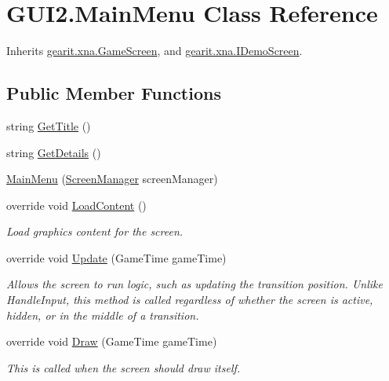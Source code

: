 \hypertarget{class_g_u_i2_1_1_main_menu}{\section{G\+U\+I2.\+Main\+Menu Class Reference}
\label{class_g_u_i2_1_1_main_menu}
}


Inherits \hyperlink{classgearit_1_1xna_1_1_game_screen}{gearit.\+xna.\+Game\+Screen}, and \hyperlink{interfacegearit_1_1xna_1_1_i_demo_screen}{gearit.\+xna.\+I\+Demo\+Screen}.

\subsection*{Public Member Functions}
\begin{DoxyCompactItemize}
\item 
string \hyperlink{class_g_u_i2_1_1_main_menu_a42dad5d14ce987d5e8eb6c4e5af1069a}{Get\+Title} ()
\item 
string \hyperlink{class_g_u_i2_1_1_main_menu_a9682f88618cdcb124ba15003749f3fcc}{Get\+Details} ()
\item 
\hyperlink{class_g_u_i2_1_1_main_menu_a1e198ea91f467e8f9c2f4eb3b7bd7fba}{Main\+Menu} (\hyperlink{classgearit_1_1xna_1_1_screen_manager}{Screen\+Manager} screen\+Manager)
\item 
override void \hyperlink{class_g_u_i2_1_1_main_menu_a28913f4d61b2f7eb011b7287c77a1ca0}{Load\+Content} ()
\begin{DoxyCompactList}\small\item\em Load graphics content for the screen. \end{DoxyCompactList}\item 
override void \hyperlink{class_g_u_i2_1_1_main_menu_a9a4fee48c5ab27b5c18dfa5760f42d27}{Update} (Game\+Time game\+Time)
\begin{DoxyCompactList}\small\item\em Allows the screen to run logic, such as updating the transition position. Unlike Handle\+Input, this method is called regardless of whether the screen is active, hidden, or in the middle of a transition. \end{DoxyCompactList}\item 
override void \hyperlink{class_g_u_i2_1_1_main_menu_a35a4f3fa03bb60327c3822458d532ea2}{Draw} (Game\+Time game\+Time)
\begin{DoxyCompactList}\small\item\em This is called when the screen should draw itself. \end{DoxyCompactList}\end{DoxyCompactItemize}
